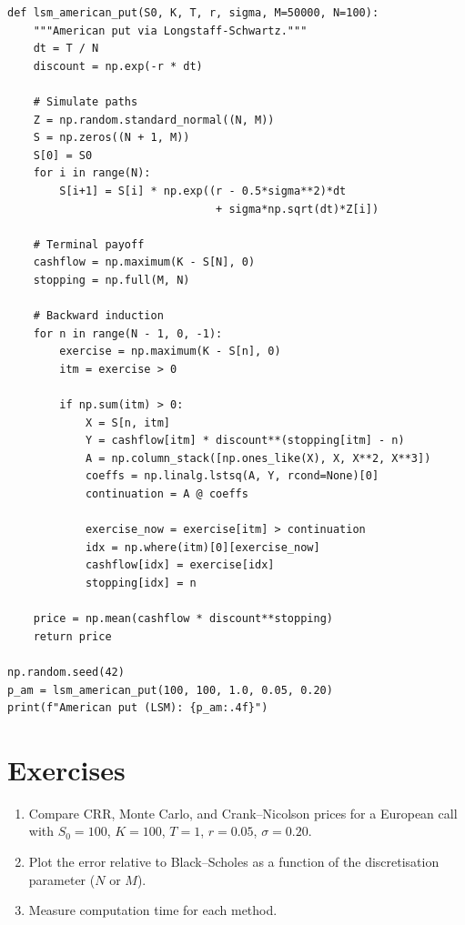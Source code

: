 \begin{codeblock}[title=\textbf{Longstaff--Schwartz for American Put}]
\begin{verbatim}
def lsm_american_put(S0, K, T, r, sigma, M=50000, N=100):
    """American put via Longstaff-Schwartz."""
    dt = T / N
    discount = np.exp(-r * dt)

    # Simulate paths
    Z = np.random.standard_normal((N, M))
    S = np.zeros((N + 1, M))
    S[0] = S0
    for i in range(N):
        S[i+1] = S[i] * np.exp((r - 0.5*sigma**2)*dt
                                + sigma*np.sqrt(dt)*Z[i])

    # Terminal payoff
    cashflow = np.maximum(K - S[N], 0)
    stopping = np.full(M, N)

    # Backward induction
    for n in range(N - 1, 0, -1):
        exercise = np.maximum(K - S[n], 0)
        itm = exercise > 0

        if np.sum(itm) > 0:
            X = S[n, itm]
            Y = cashflow[itm] * discount**(stopping[itm] - n)
            A = np.column_stack([np.ones_like(X), X, X**2, X**3])
            coeffs = np.linalg.lstsq(A, Y, rcond=None)[0]
            continuation = A @ coeffs

            exercise_now = exercise[itm] > continuation
            idx = np.where(itm)[0][exercise_now]
            cashflow[idx] = exercise[idx]
            stopping[idx] = n

    price = np.mean(cashflow * discount**stopping)
    return price

np.random.seed(42)
p_am = lsm_american_put(100, 100, 1.0, 0.05, 0.20)
print(f"American put (LSM): {p_am:.4f}")
\end{verbatim}
\end{codeblock}

\section{Exercises}

\begin{exercise}
\begin{enumerate}
    \item Compare CRR, Monte Carlo, and Crank--Nicolson prices for a
          European call with $S_0=100$, $K=100$, $T=1$, $r=0.05$,
          $\sigma=0.20$.
    \item Plot the error relative to Black--Scholes as a function of the
          discretisation parameter ($N$ or $M$).
    \item Measure computation time for each method.
\end{enumerate}
\end{exercise}

